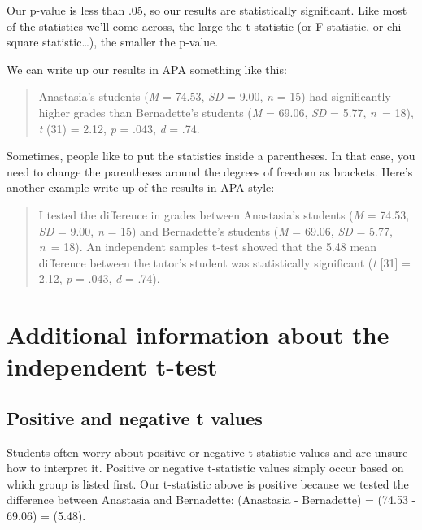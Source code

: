 \documentclass[
]{book}
\begin{document}
Our p-value is less than .05, so our results are statistically significant. Like most of the statistics we'll come across, the large the t-statistic (or F-statistic, or chi-square statistic\ldots), the smaller the p-value.

We can write up our results in APA something like this:

\begin{quote}
Anastasia's students (\emph{M} = 74.53, \emph{SD} = 9.00, \emph{n} = 15) had significantly higher grades than Bernadette's students (\emph{M} = 69.06, \emph{SD} = 5.77, \emph{n}~= 18), \emph{t} (31) = 2.12, \emph{p} = .043, \emph{d} = .74.
\end{quote}

Sometimes, people like to put the statistics inside a parentheses. In that case, you need to change the parentheses around the degrees of freedom as brackets. Here's another example write-up of the results in APA style:

\begin{quote}
I tested the difference in grades between Anastasia's students (\emph{M} = 74.53, \emph{SD} = 9.00, \emph{n} = 15) and Bernadette's students (\emph{M} = 69.06, \emph{SD} = 5.77, \emph{n}~= 18). An independent samples t-test showed that the 5.48 mean difference between the tutor's student was statistically significant (\emph{t} {[}31{]} = 2.12, \emph{p} = .043, \emph{d} = .74).
\end{quote}

\hypertarget{additional-information-about-the-independent-t-test}{%
\section{Additional information about the independent t-test}\label{additional-information-about-the-independent-t-test}}

\hypertarget{positive-and-negative-t-values}{%
\subsection{Positive and negative t values}\label{positive-and-negative-t-values}}

Students often worry about positive or negative t-statistic values and are unsure how to interpret it. Positive or negative t-statistic values simply occur based on which group is listed first. Our t-statistic above is positive because we tested the difference between Anastasia and Bernadette: (Anastasia - Bernadette) = (74.53 - 69.06) = (5.48).
\end{document}
